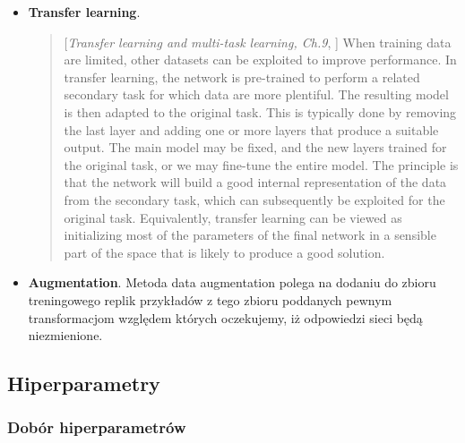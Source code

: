 \documentclass{myclass}
\numberwithin{equation}{subsection}
\begin{document}
\begin{itemize}
\item \textbf{Transfer learning}. 
\begin{quote}[\textit{Transfer learning and multi-task learning, Ch.9},
\cite{prince2023understanding}] When training data are limited, other datasets can be exploited to
improve performance. In transfer learning, the network is pre-trained to perform a related secondary
task for which data are more plentiful. The resulting model is then adapted to the original task.
This is typically done by removing the last layer and adding one or more layers that produce a
suitable output. The main model may be fixed, and the new layers trained for the original task, or
we may fine-tune the entire model. The principle is that the network will build a good internal
representation of the data from the secondary task, which can subsequently be exploited for the
original task. Equivalently, transfer learning can be viewed as initializing most of the parameters
of the final network in a sensible part of the space that is likely to produce a good solution.
\end{quote}

\item \textbf{Augmentation}. Metoda data augmentation polega na dodaniu do zbioru treningowego
replik przykładów z tego zbioru poddanych pewnym transformacjom względem których oczekujemy, iż
odpowiedzi sieci będą niezmienione.
\end{itemize}


\subsection{Hiperparametry}

\subsubsection{Dobór hiperparametrów}
\end{document}
